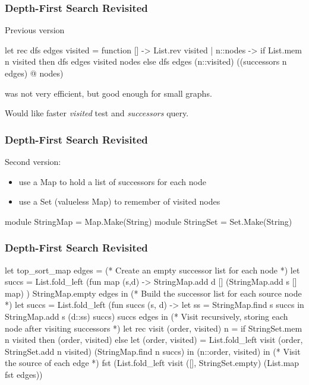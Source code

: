 \documentclass{plt}
\begin{document}
\begin{frame}[fragile]
  \frametitle{Depth-First Search Revisited}

Previous version

\begin{ocaml}
let rec dfs edges visited = function
  []       -> List.rev visited
| n::nodes ->
  if List.mem n visited then
    dfs edges visited nodes
  else
    dfs edges (n::visited) ((successors n edges) @ nodes)
\end{ocaml}

was not very efficient, but good enough for small graphs.

Would like faster \emph{visited} test and \emph{successors} query.

\end{frame}

\begin{frame}[fragile]
  \frametitle{Depth-First Search Revisited}

Second version:

\begin{itemize}
\item use a Map to hold a list of successors for each node
\item use a Set (valueless Map) to remember of visited nodes
\end{itemize}

\begin{ocaml}
module StringMap = Map.Make(String)
module StringSet = Set.Make(String)
\end{ocaml}

\end{frame}

\begin{frame}[fragile]
  \frametitle{Depth-First Search Revisited}

\begin{ocaml}
let top_sort_map edges =
  (* Create an empty successor list for each node *)
  let succs = List.fold_left
      (fun map (s,d) ->
        StringMap.add d [] (StringMap.add s [] map)
      ) StringMap.empty edges
  in
  (* Build the successor list for each source node *)
  let succs = List.fold_left
      (fun succs (s, d) ->
        let ss = StringMap.find s succs
        in StringMap.add s (d::ss) succs) succs edges
  in
  (* Visit recursively, storing each node after visiting successors *)
  let rec visit (order, visited) n =
    if StringSet.mem n visited then
      (order, visited)
    else
      let (order, visited) = List.fold_left
          visit (order, StringSet.add n visited)
          (StringMap.find n succs)
      in (n::order, visited)
  in
  (* Visit the source of each edge *)
  fst (List.fold_left visit ([], StringSet.empty) (List.map fst edges))
\end{ocaml}

\end{frame}
\end{document}
